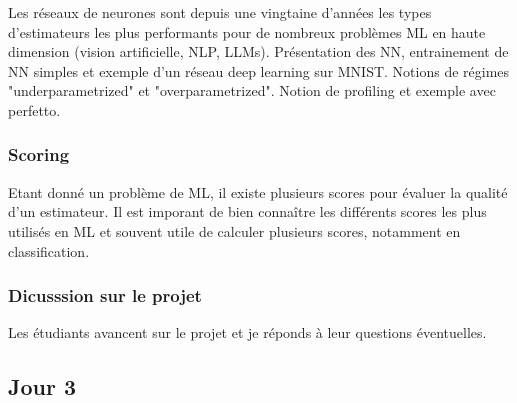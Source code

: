 \documentclass[
10pt, %
a4paper, %
oneside, %
headinclude,footinclude, %
BCOR5mm, %
]{scrartcl}
\begin{document}
Les réseaux de neurones sont depuis une vingtaine d'années les types d'estimateurs les plus performants pour de nombreux problèmes ML en haute dimension (vision artificielle, NLP, LLMs). Présentation des NN, entrainement de NN simples et exemple d'un réseau deep learning sur MNIST. Notions de régimes "underparametrized" et "overparametrized". Notion de profiling et exemple avec perfetto.

\subsubsection{Scoring}%
\label{ssub:}

Etant donné un problème de ML, il existe plusieurs scores pour évaluer la qualité d'un estimateur. Il est imporant de bien connaître les différents scores les plus utilisés en ML et souvent utile de calculer plusieurs scores, notamment en classification.

\subsubsection{Dicusssion sur le projet}%
\label{ssub:Validation des datasets choisis par les étudiants.}

Les étudiants avancent sur le projet et je réponds à leur questions éventuelles.



\subsection{\large{Jour 3}}%
\label{sec:Jour 3}

\end{document}
